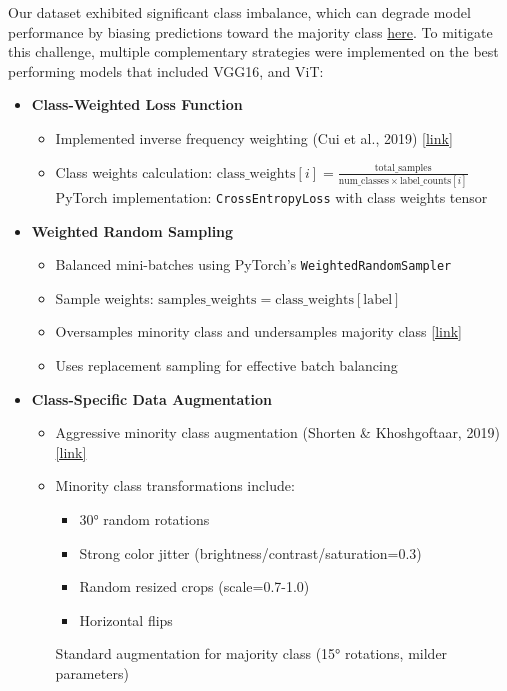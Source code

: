 \documentclass[a4paper,12pt]{article}
\begin{document}
Our dataset exhibited significant class imbalance, which can degrade model performance by biasing predictions toward the majority class \href{https://journalofbigdata.springeropen.com/articles/10.1186/s40537-019-0192-5}{here}. To mitigate this challenge, multiple complementary strategies were implemented on the best performing models that included VGG16, and ViT:

\begin{itemize}
    \item \textbf{Class-Weighted Loss Function}
    \begin{itemize}
        \item Implemented inverse frequency weighting (Cui et al., 2019) \href{https://openaccess.thecvf.com/content_CVPR_2019/papers/Cui_Class-Balanced_Loss_Based_on_Effective_Number_of_Samples_CVPR_2019_paper.pdf}{[link]}
        \item Class weights calculation: \( \text{class\_weights}[i] = \frac{\text{total\_samples}}{\text{num\_classes} \times \text{label\_counts}[i]} \)
        \subitem PyTorch implementation: \texttt{CrossEntropyLoss} with class weights tensor
    \end{itemize}
    
    \item \textbf{Weighted Random Sampling}
    \begin{itemize}
        \item Balanced mini-batches using PyTorch's \texttt{WeightedRandomSampler}
        \item Sample weights: \( \text{samples\_weights} = \text{class\_weights}[\text{label}] \)
        \item Oversamples minority class and undersamples majority class \href{https://www.sciencedirect.com/science/article/pii/S0893608018302107}{[link]}
        \item Uses replacement sampling for effective batch balancing
    \end{itemize}
    
    \item \textbf{Class-Specific Data Augmentation}
    \begin{itemize}
        \item Aggressive minority class augmentation (Shorten \& Khoshgoftaar, 2019) \href{https://journalofbigdata.springeropen.com/articles/10.1186/s40537-019-0197-0}{[link]}
        \item Minority class transformations include:
        \begin{itemize}
            \item 30° random rotations
            \item Strong color jitter (brightness/contrast/saturation=0.3)
            \item Random resized crops (scale=0.7-1.0)
            \item Horizontal flips
        \end{itemize}
        \subitem Standard augmentation for majority class (15° rotations, milder parameters)
    \end{itemize}
\end{itemize}
\end{document}
